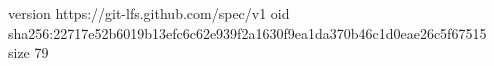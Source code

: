 version https://git-lfs.github.com/spec/v1
oid sha256:22717e52b6019b13efc6c62e939f2a1630f9ea1da370b46c1d0eae26c5f67515
size 79
